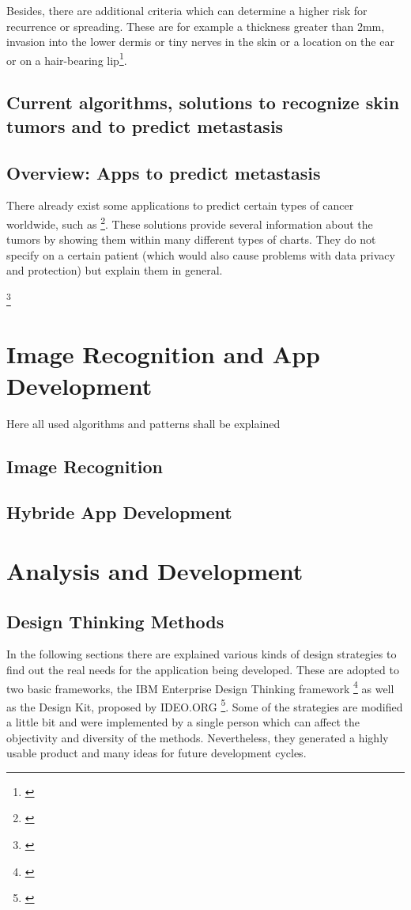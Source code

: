 Besides, there are additional criteria which can determine a higher risk for recurrence or spreading. These are for example a thickness greater than 2mm, invasion into the lower dermis or tiny nerves in the skin or a location on the ear or on a hair-bearing lip\footnote{\cite{skin_cancer_types}}.

\section{Current algorithms, solutions to recognize skin tumors and to predict metastasis}

\section{Overview: Apps to predict metastasis}

There already exist some applications to predict certain types of cancer worldwide, such as \footnote{\cite{iarc_predict_cancer_worldwide}}. These solutions provide several information about the tumors by showing them within many different types of charts. They do not specify on a certain patient (which would also cause problems with data privacy and protection) but explain them in general.  


\footnote{\cite{vijini_gen_alg}}


\chapter{Image Recognition and App Development}
Here all used algorithms and patterns shall be explained

\section{Image Recognition}
\section{Hybride App Development}


\chapter{Analysis and Development}

\section{Design Thinking Methods}

In the following sections there are explained various kinds of design strategies to find out the real needs for the application being developed. These are adopted to two basic frameworks, the IBM Enterprise Design Thinking framework \footnote{\cite{ibm_edt}} as well as the Design Kit, proposed by IDEO.ORG \footnote{\cite{design_kit}}. Some of the strategies are modified a little bit and were implemented by a single person which can affect the objectivity and diversity of the methods. Nevertheless, they generated a highly usable product and many ideas for future development cycles. 

